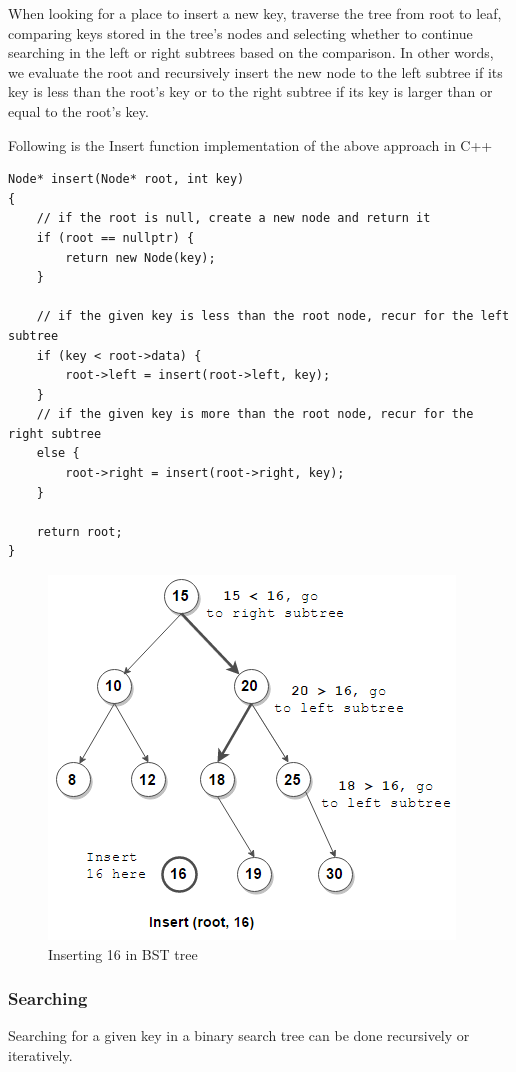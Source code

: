 \documentclass[11pt]{article}
\begin{document}
        When looking for a place to insert a new key, traverse the tree from root to leaf, comparing keys stored in the tree's nodes and selecting whether to continue searching in the left or right subtrees based on the comparison. In other words, we evaluate the root and recursively insert the new node to the left subtree if its key is less than the root's key or to the right subtree if its key is larger than or equal to the root's key.\newline
        
Following is the Insert function implementation of the above approach in C++
\begin{lstlisting}
Node* insert(Node* root, int key)
{
    // if the root is null, create a new node and return it
    if (root == nullptr) {
        return new Node(key);
    }
 
    // if the given key is less than the root node, recur for the left subtree
    if (key < root->data) {
        root->left = insert(root->left, key);
    }
    // if the given key is more than the root node, recur for the right subtree
    else {
        root->right = insert(root->right, key);
    }
 
    return root;
}
\end{lstlisting}

        \begin{figure}[H]
            \centering
            \includegraphics[scale=0.7]{InsertBST.png}
            \caption{Inserting 16 in BST tree}\label{InsertBST}
        \end{figure}
    
        \subsubsection{Searching}
        Searching for a given key in a binary search tree can be done recursively or iteratively.\newline
        
\end{document}
